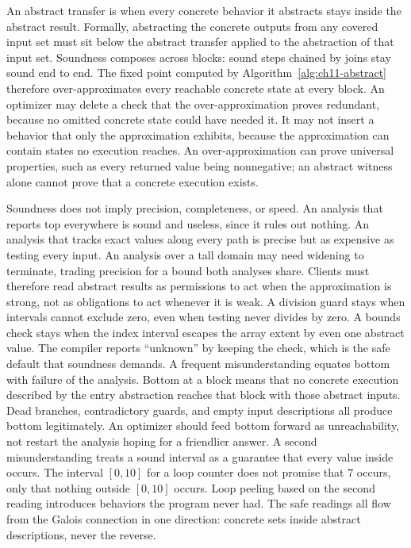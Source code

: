 An abstract transfer is  when every concrete behavior it abstracts stays inside the abstract result.
Formally, abstracting the concrete outputs from any covered input set must sit below the abstract transfer applied to the abstraction of that input set.
Soundness composes across blocks: sound steps chained by joins stay sound end to end.
The fixed point computed by Algorithm~\ref{alg:ch11-abstract} therefore over-approximates every reachable concrete state at every block.
An optimizer may delete a check that the over-approximation proves redundant, because no omitted concrete state could have needed it.
It may not insert a behavior that only the approximation exhibits, because the approximation can contain states no execution reaches.
An over-approximation can prove universal properties, such as every returned value being nonnegative; an abstract witness alone cannot prove that a concrete execution exists.

Soundness does not imply precision, completeness, or speed.
An analysis that reports top everywhere is sound and useless, since it rules out nothing.
An analysis that tracks exact values along every path is precise but as expensive as testing every input.
An analysis over a tall domain may need widening to terminate, trading precision for a bound both analyses share.
Clients must therefore read abstract results as permissions to act when the approximation is strong, not as obligations to act whenever it is weak.
A division guard stays when intervals cannot exclude zero, even when testing never divides by zero.
A bounds check stays when the index interval escapes the array extent by even one abstract value.
The compiler reports \enquote{unknown} by keeping the check, which is the safe default that soundness demands.
A frequent misunderstanding equates bottom with failure of the analysis.
Bottom at a block means that no concrete execution described by the entry abstraction reaches that block with those abstract inputs.
Dead branches, contradictory guards, and empty input descriptions all produce bottom legitimately.
An optimizer should feed bottom forward as unreachability, not restart the analysis hoping for a friendlier answer.
A second misunderstanding treats a sound interval as a guarantee that every value inside occurs.
The interval $[0, 10]$ for a loop counter does not promise that $7$ occurs, only that nothing outside $[0, 10]$ occurs.
Loop peeling based on the second reading introduces behaviors the program never had.
The safe readings all flow from the Galois connection in one direction: concrete sets inside abstract descriptions, never the reverse.

